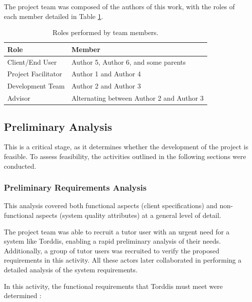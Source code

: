 		The project team was composed of the authors of this work, with the roles of each member detailed in Table \ref{tab:Roles}.
		
		\begin{table}[!htbp]
			\caption{Roles performed by team members.\label{tab:Roles}}
			\begin{tabularx}{0.8\textwidth}{>{\arraybackslash}X >{\arraybackslash}X}
				\toprule
				\textbf{Role} & \textbf{Member}\\
				\midrule
				Client/End User & Author 5, Author 6, and some parents\\
				Project Facilitator & Author 1 and Author 4\\
				Development Team & Author 2 and Author 3\\
				Advisor & Alternating between Author 2 and Author 3\\
				\bottomrule
			\end{tabularx}
		\end{table}
		
		\subsection{Preliminary Analysis}
			This is a critical stage, as it determines whether the development of the project is feasible. To assess feasibility, the activities outlined in the following sections were conducted.
			
			\subsubsection{Preliminary Requirements Analysis}
				This analysis covered both functional aspects (client specifications) and non-functional aspects (system quality attributes) at a general level of detail.
				
				The project team was able to recruit a tutor user with an urgent need for a system like Torddis, enabling a rapid preliminary analysis of their needs. Additionally, a group of tutor users was recruited to verify the proposed requirements in this activity. All these actors later collaborated in performing a detailed analysis of the system requirements.
				
				In this activity, the functional requirements that Torddis must meet were determined \citep{Asish2022Detecting,Pabba2022AnIntelligent,Vettivel2018System}:
				
